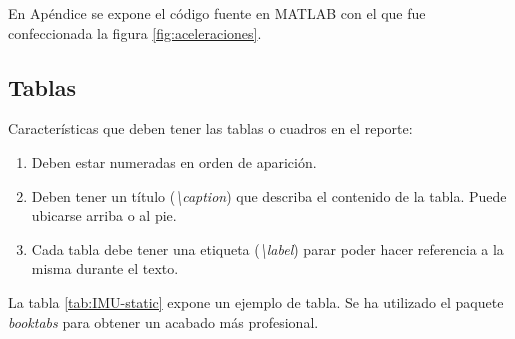 \documentclass{article}
\begin{document}
En Apéndice se expone el código fuente en MATLAB con el que fue confeccionada la figura \ref{fig:aceleraciones}.

\subsection{Tablas}
\label{sec:tablas}

Características que deben tener las tablas o cuadros en el reporte:

\begin{enumerate}

    \item Deben estar numeradas en orden de aparición.

    \item Deben tener un título (\emph{\textbackslash caption}) que describa el contenido de la tabla. Puede ubicarse arriba o al pie.
    
    \item Cada tabla debe tener una etiqueta (\emph{\textbackslash label}) parar poder hacer referencia a la misma durante el texto.
    
\end{enumerate}

La tabla \ref{tab:IMU-static} expone un ejemplo de tabla. Se ha utilizado el paquete \emph{booktabs} para obtener un acabado más profesional.
\end{document}
